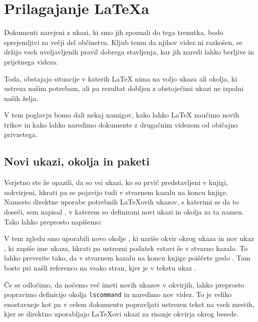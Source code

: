 \chapter{Prilagajanje \LaTeX{}a}

\begin{intro}
Dokumenti narejeni z ukazi, ki smo jih spoznali do tega trenutka, bodo sprejemljivi za
večji del občinstva. Kljub temu da njihov videz ni razkošen, se držijo vseh uveljavljenih 
pravil dobrega stavljenja, kar jih naredi lahko berljive in prijetnega videza.

Toda, obstajajo situacije v katerih \LaTeX{} nima na voljo ukaza ali okolja,
ki ustreza našim potrebam, ali pa rezultat dobljen z obstoječimi ukazi ne
izpolni naših želja.

V tem poglavju bomo dali nekaj namigov, kako lahko \LaTeX{} naučimo novih trikov in kako
lahko naredimo dokumente z drugačnim videzom od običajno privzetega.
\end{intro}

\section{Novi ukazi, okolja in paketi}

Verjetno ste že opazili, da so vsi ukazi, ko so prvič predstavljeni v knjigi, 
uokvirjeni, hkrati pa se pojavijo tudi v stvarnem kazalu na koncu knjige. 
Namesto direktne uporabe potrebnih \LaTeX{}ovih ukazov, s katerimi se da to doseči,
sem napisal , v katerem so definirani novi ukazi in okolja za ta namen. 
Tako lahko preprosto napišemo:

\begin{example}
\begin{lscommand}
\end{lscommand}
\end{example}

V tem zgledu smo uporabili novo okolje , ki nariše okvir okrog 
ukaza in nov ukaz , ki zapiše ime ukaza, hkrati pa ustrezni podatek 
vstavi še v stvarno kazalo. To lahko preverite tako, da v stvarnem kazalu na 
koncu knjige poiščete geslo .
Tam boste pri  našli referenco na vsako stran, kjer je v tekstu ukaz 
.

Če se odločimo, da nočemo več imeti novih ukazov v okvirjih,
lahko preprosto popravimo definicijo okolja \texttt{lscommand} in naredimo nov videz. 
To je veliko enostavneje kot pa v celem dokumentu popravljati ustrezen tekst
na vseh mestih, kjer se direktno uporabljajo \LaTeX{}ovi ukazi za risanje okvirja okrog
besede.


